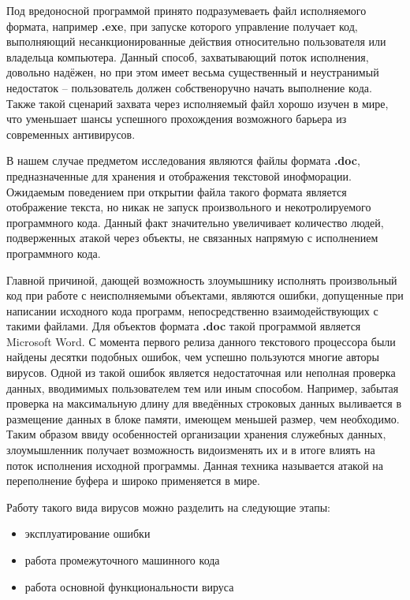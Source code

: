 Под вредоносной программой принято подразумеваеть файл исполняемого формата, например \textbf{.exe}, при запуске которого управление получает код, выполняющий несанкционированные действия относительно пользователя или владельца компьютера. 
Данный способ, захватывающий поток исполнения, довольно надёжен, но при этом имеет весьма существенный и неустранимый недостаток -- пользователь должен собственоручно начать выполнение кода.
Также такой сценарий захвата через исполняемый файл хорошо изучен в мире, что уменьшает шансы успешного прохождения возможного барьера из современных антивирусов.

В нашем случае предметом исследования являются файлы формата \textbf{.doc}, предназначенные для хранения и отображения текстовой инофморации. 
Ожидаемым поведением при открытии файла такого формата является отображение текста, но никак не запуск произвольного и некотролируемого программного кода.
Данный факт значительно увеличивает количество людей, подверженных атакой через объекты, не связанных напрямую с исполнением программного кода.

Главной причиной, дающей возможность злоумышнику исполнять произвольный код при работе с неисполняемыми объектами, являются ошибки, допущенные при написании исходного кода программ, непосредственно взаимодействующих с такими файлами. 
Для объектов формата \textbf{.doc} такой программой является Microsoft Word.
С момента первого релиза данного текстового процессора были найдены десятки подобных ошибок, чем успешно пользуются многие авторы вирусов.
Одной из такой ошибок является недостаточная или неполная проверка данных, вводимимых пользователем тем или иным способом.
Например, забытая проверка на максимальную длину для введённых строковых данных выливается в размещение данных в блоке памяти, имеющем меньшей размер, чем необходимо. 
Таким образом ввиду особенностей организации хранения служебных данных, злоумышленник получает возможность видоизменять их и в итоге влиять на поток исполнения исходной программы.
Данная техника называется атакой на переполнение буфера и широко применяется в мире.

Работу такого вида вирусов можно разделить на следующие этапы:

\begin{itemize}
\item эксплуатирование ошибки
\item работа промежуточного машинного кода
\item работа основной функциональности вируса
\end{itemize}

